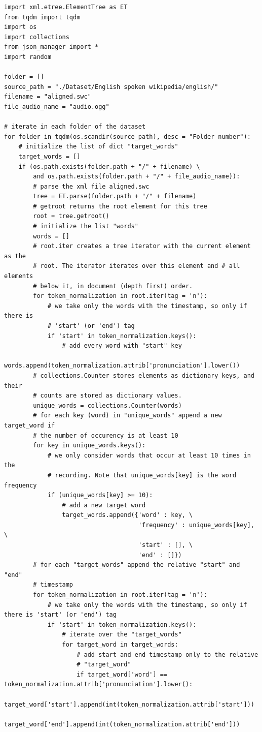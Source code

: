 \documentclass[12pt,a4paper,titlepage]{article}
\begin{document}
\begin{lstlisting}[language=iPython,firstnumber=1, caption=find\_target\_words.py, label=find_target_words,captionpos=b]
import xml.etree.ElementTree as ET
from tqdm import tqdm
import os
import collections
from json_manager import *
import random

folder = []
source_path = "./Dataset/English spoken wikipedia/english/"
filename = "aligned.swc"
file_audio_name = "audio.ogg"

# iterate in each folder of the dataset
for folder in tqdm(os.scandir(source_path), desc = "Folder number"):
    # initialize the list of dict "target_words"
    target_words = []
    if (os.path.exists(folder.path + "/" + filename) \
        and os.path.exists(folder.path + "/" + file_audio_name)):  
        # parse the xml file aligned.swc
        tree = ET.parse(folder.path + "/" + filename)
        # getroot returns the root element for this tree
        root = tree.getroot()
        # initialize the list "words"
        words = []
        # root.iter creates a tree iterator with the current element as the 
        # root. The iterator iterates over this element and # all elements 
        # below it, in document (depth first) order.
        for token_normalization in root.iter(tag = 'n'):
            # we take only the words with the timestamp, so only if there is
            # 'start' (or 'end') tag
            if 'start' in token_normalization.keys():
                # add every word with "start" key
                words.append(token_normalization.attrib['pronunciation'].lower())
        # collections.Counter stores elements as dictionary keys, and their
        # counts are stored as dictionary values.
        unique_words = collections.Counter(words)
        # for each key (word) in "unique_words" append a new target_word if
        # the number of occurency is at least 10
        for key in unique_words.keys():
            # we only consider words that occur at least 10 times in the
            # recording. Note that unique_words[key] is the word frequency
            if (unique_words[key] >= 10):
                # add a new target word
                target_words.append({'word' : key, \
                                     'frequency' : unique_words[key], \
                                     'start' : [], \
                                     'end' : []})
        # for each "target_words" append the relative "start" and "end"
        # timestamp
        for token_normalization in root.iter(tag = 'n'):
            # we take only the words with the timestamp, so only if there is 'start' (or 'end') tag
            if 'start' in token_normalization.keys():
                # iterate over the "target_words"
                for target_word in target_words:
                    # add start and end timestamp only to the relative
                    # "target_word"
                    if target_word['word'] == token_normalization.attrib['pronunciation'].lower():
                        target_word['start'].append(int(token_normalization.attrib['start']))
                        target_word['end'].append(int(token_normalization.attrib['end']))


\end{lstlisting}
\end{document}
